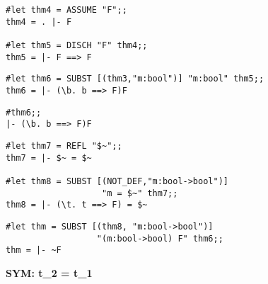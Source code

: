 \vskip4mm
\begin{session}\begin{verbatim}
#let thm4 = ASSUME "F";;
thm4 = . |- F

#let thm5 = DISCH "F" thm4;;
thm5 = |- F ==> F
\end{verbatim}\end{session}

\vskip4mm
\begin{session}\begin{verbatim}
#let thm6 = SUBST [(thm3,"m:bool")] "m:bool" thm5;;
thm6 = |- (\b. b ==> F)F
\end{verbatim}\end{session}


\vskip4mm
\begin{session}\begin{verbatim}
#thm6;;
|- (\b. b ==> F)F
\end{verbatim}\end{session}

\vskip4mm

\begin{session}\begin{verbatim}
#let thm7 = REFL "$~";;
thm7 = |- $~ = $~

#let thm8 = SUBST [(NOT_DEF,"m:bool->bool")] 
                   "m = $~" thm7;;
thm8 = |- (\t. t ==> F) = $~
\end{verbatim}\end{session}

\vskip4mm
\begin{session}\begin{verbatim}
#let thm = SUBST [(thm8, "m:bool->bool")] 
                  "(m:bool->bool) F" thm6;;
thm = |- ~F
\end{verbatim}\end{session}




\vskip7mm
\vskip 10mm
\bspindent\LARGE\bf
{\Large\bf SYM:\quad}
{\Gamma \vdash t_2  =  t_1}
\espindent

